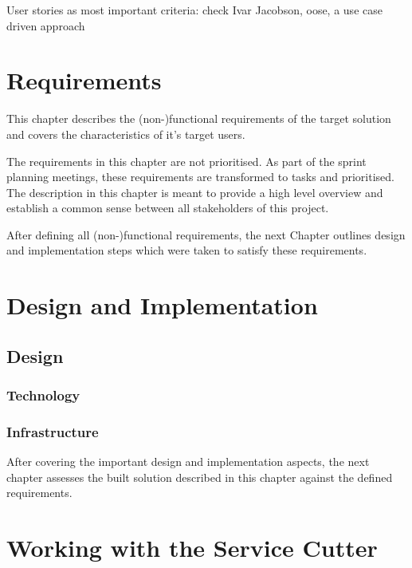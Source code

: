 \documentclass[hsr-ba,english]{hgbthesis}
\begin{document}
User stories as most important criteria: check Ivar Jacobson, oose, a use case driven approach



\chapter{Requirements}
\label{cha:requirements}

This chapter describes the (non-)functional requirements of the target solution and covers the characteristics of it's target users. 

The requirements in this chapter are not prioritised. As part of the sprint planning meetings, these requirements are transformed to tasks and prioritised. The description in this chapter is meant to provide a high level overview and establish a common sense between all stakeholders of this project.






\bigskip

After defining all (non-)functional requirements, the next Chapter outlines design and implementation steps which were taken to satisfy these requirements.


\chapter{Design and Implementation}
\label{cha:implementation}


\section{Design} 


\subsection{Technology}


\subsection{Infrastructure}



\bigskip
After covering the important design and implementation aspects, the next chapter assesses the built solution described in this chapter against the defined requirements.

\chapter{Working with the Service Cutter}
\end{document}
